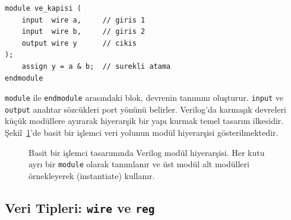 \begin{lstlisting}[style=verilog, caption={Verilog modül yapısı: 2 girişli VE kapısı}, label={lst:ekd-ve-kapisi}]
module ve_kapisi (
    input  wire a,     // giris 1
    input  wire b,     // giris 2
    output wire y      // cikis
);
    assign y = a & b;  // surekli atama
endmodule
\end{lstlisting}

\texttt{module} ile \texttt{endmodule} arasındaki blok, devrenin tanımını oluşturur. \texttt{input} ve \texttt{output} anahtar sözcükleri port yönünü belirler. Verilog'da karmaşık devreleri küçük modüllere ayırarak hiyerarşik bir yapı kurmak temel tasarım ilkesidir. Şekil~\ref{fig:ekd-modul-hiyerarsi}'de basit bir işlemci veri yolunun modül hiyerarşisi gösterilmektedir.

\begin{figure}[H]
\centering
{}
\caption[Verilog modül hiyerarşisi]{Basit bir işlemci tasarımında Verilog modül hiyerarşisi. Her kutu ayrı bir \texttt{module} olarak tanımlanır ve üst modül alt modülleri örnekleyerek (instantiate) kullanır.}
\label{fig:ekd-modul-hiyerarsi}
\end{figure}

\subsection{Veri Tipleri: \texttt{wire} ve \texttt{reg}}
\label{sec:ekd-wire-reg}


